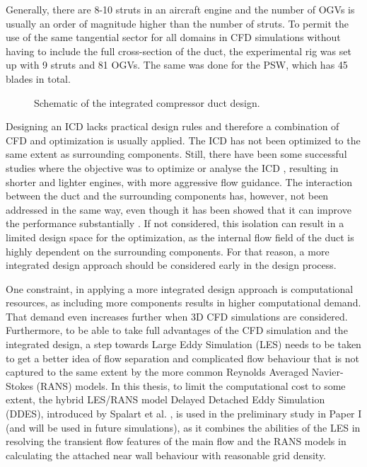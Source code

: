 Generally, there are 8-10 struts in an aircraft engine and the number of OGVs is usually an order of magnitude higher than the number of struts. To permit the use of the same tangential sector for all domains in CFD simulations without having to include the full cross-section of the duct, the experimental rig was set up with 9 struts and 81 OGVs. The same was done for the PSW, which has 45 blades in total.

 \begin{figure}[h!]
   \centering

  \caption{Schematic of the integrated compressor duct design.}
  \label{fig:schema}
\end{figure}

Designing an ICD lacks practical design rules and therefore a combination of CFD and optimization is usually applied. The ICD has not been optimized to the same extent as surrounding components. Still, there have been some successful studies where the objective was to optimize or analyse the ICD \cite{CompressorOpt,OptComp1,OptComp2,Walker2011}, resulting in shorter and lighter engines, with more aggressive flow guidance. The interaction between the duct and the surrounding components has, however, not been addressed in the same way, even though it has been showed that it can improve the performance substantially \cite{IntegrP2}. If not considered, this isolation can result in a limited design space for the optimization, as the internal flow field of the duct is highly dependent on the surrounding components. For that reason, a more integrated design approach should be considered early in the design process.

One constraint, in applying a more integrated design approach is computational resources, as including more components results in higher computational demand. That demand even increases further when 3D CFD simulations are considered. Furthermore, to be able to take full advantages of the CFD simulation and the integrated design, a step towards Large Eddy Simulation (LES) needs to be taken to get a better idea of flow separation and complicated flow behaviour that is not captured to the same extent by the more common Reynolds Averaged Navier-Stokes (RANS) models. In this thesis, to limit the computational cost to some extent, the hybrid LES/RANS model Delayed Detached Eddy Simulation (DDES), introduced by Spalart et al. \cite{DDES}, is used in the preliminary study in Paper I (and will be used in future simulations), as it combines the abilities of the LES in resolving the transient flow features of the main flow and the RANS models in calculating the attached near wall behaviour with reasonable grid density. 

